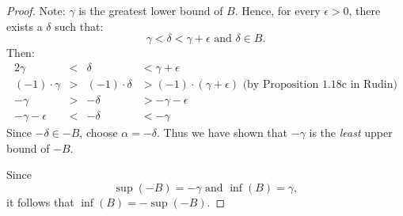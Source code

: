 \documentclass{amsart}
\begin{document}
\begin{enumerate}[1.]
\begin{proof}
Note: $\gamma$ is the greatest lower bound of $B$. Hence, for every
$\epsilon > 0$, there exists a $\delta$ such that:
\[
    \gamma < \delta < \gamma + \epsilon \text{ and } \delta\in B.
\]
Then:
\begin{alignat*}{2}
    \gamma &< &\delta &< \gamma + \epsilon \\
    (-1)\cdot\gamma &> &(-1)\cdot\delta &> (-1)\cdot(\gamma + \epsilon) \text{ (by Proposition 1.18c in Rudin)}\\
    -\gamma &> &-\delta &> -\gamma -\epsilon \\
    -\gamma -\epsilon &< &-\delta &< -\gamma
\end{alignat*}
Since $-\delta\in -B$, choose $\alpha = -\delta$. Thus we have shown that
$-\gamma$ is the \emph{least} upper bound of $-B$. 

Since
\[
    \sup(-B) = -\gamma \text{ and } \inf(B) = \gamma,
\]
it follows that $\inf(B) = -\sup(-B)$.
\end{proof}

\newpage

\end{enumerate}
\end{document}
